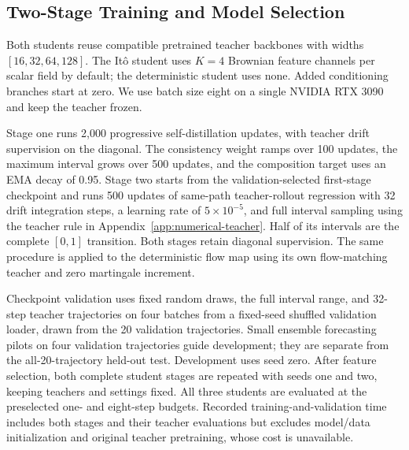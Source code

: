 \subsection{Two-Stage Training and Model Selection}
Both students reuse compatible pretrained teacher backbones with widths $[16,32,64,128]$. The It\^o student uses $K=4$ Brownian feature channels per scalar field by default; the deterministic student uses none. Added conditioning branches start at zero. We use batch size eight on a single NVIDIA RTX 3090 and keep the teacher frozen.

Stage one runs 2,000 progressive self-distillation updates, with teacher drift supervision on the diagonal. The consistency weight ramps over 100 updates, the maximum interval grows over 500 updates, and the composition target uses an EMA decay of 0.95. Stage two starts from the validation-selected first-stage checkpoint and runs 500 updates of same-path teacher-rollout regression with 32 drift integration steps, a learning rate of $5\times10^{-5}$, and full interval sampling using the teacher rule in Appendix~\ref{app:numerical-teacher}. Half of its intervals are the complete $[0,1]$ transition. Both stages retain diagonal supervision. The same procedure is applied to the deterministic flow map using its own flow-matching teacher and zero martingale increment.

Checkpoint validation uses fixed random draws, the full interval range, and 32-step teacher trajectories on four batches from a fixed-seed shuffled validation loader, drawn from the 20 validation trajectories. Small ensemble forecasting pilots on four validation trajectories guide development; they are separate from the all-20-trajectory held-out test. Development uses seed zero. After feature selection, both complete student stages are repeated with seeds one and two, keeping teachers and settings fixed. All three students are evaluated at the preselected one- and eight-step budgets. Recorded training-and-validation time includes both stages and their teacher evaluations but excludes model/data initialization and original teacher pretraining, whose cost is unavailable.

